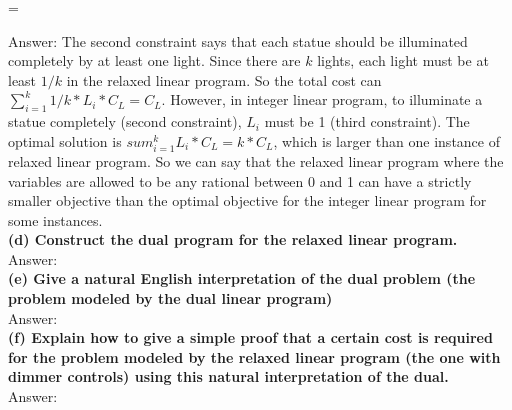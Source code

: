 =\documentclass{article}
\begin{document}
Answer: The second constraint says that each statue should be illuminated completely by at least one light. Since there are $k$ lights, each light must be at least $1/k$ in the relaxed linear program. So the total cost can $\sum_{i=1}^{k} 1/k * L_{i} * C_{L} = C_{L}$. However, in integer linear program, to illuminate a statue completely (second constraint), $L_{i}$ must be 1 (third constraint). The optimal solution is $sum_{i=1}^{k}{L_{i}*C_L} = k*C_{L}$, which is larger than one instance of relaxed linear program. So we can say that the relaxed linear program where the variables are allowed to be any rational between 0 and 1 can have a strictly smaller objective than the optimal objective for the integer linear program for some instances.\\ \newline
\textbf{(d) Construct the dual program for the relaxed linear program.} \\ \newline
Answer: \\ \newline
\textbf{(e) Give a natural English interpretation of the dual problem (the problem modeled by the dual linear program)} \\ \newline
Answer: \\ \newline
\textbf{(f) Explain how to give a simple proof that a certain cost is required for the problem modeled by the relaxed linear program (the one with dimmer controls) using this natural interpretation of the dual.} \\ \newline
Answer: 
\end{document}

